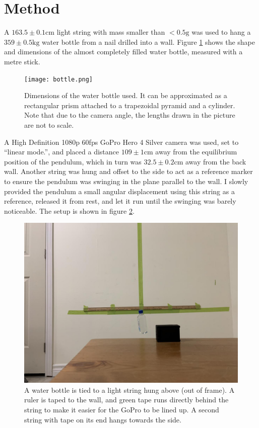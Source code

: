 \documentclass[%
 reprint,
 amsmath,amssymb
 aps,
]{revtex4-2}
\begin{document}
\section{Method}
A $163.5\pm 0.1 \si{\centi\metre}$ light string with mass smaller than $ <0.5\si{\gram}$ was used to hang a $359\pm 0.5\si{\kilogram}$ water bottle from a nail drilled into a wall.  Figure \ref{fig:bottle} shows the shape and dimensions of the almost completely filled water bottle, measured with a metre stick.
\begin{figure}[!h]
    \texttt{[image: bottle.png]}
    \caption{Dimensions of the water bottle used. It can be approximated as a rectangular prism attached to a trapezoidal pyramid and a cylinder. Note that due to the camera angle, the lengths drawn in the picture are not to scale.}
    \label{fig:bottle}
\end{figure}
A High Definition 1080p 60fps GoPro Hero 4 Silver camera was used, set to ``linear mode.'', and placed a distance $109 \pm \si{1\centi\metre}$ away from the equilibrium position of the pendulum, which in turn was $32.5\pm 0.2\si{\centi\metre}$ away from the back wall. Another string was hung and offset to the side to act as a reference marker to ensure the pendulum was swinging in the plane parallel to the wall. I slowly provided the pendulum a small angular displacement using this string as a reference, released it from rest, and let it run until the swinging was barely noticeable. The setup is shown in figure \ref{fig:setup}.
\begin{figure}[!h]
    \includegraphics[width=\linewidth]{setup.jpg}
    \caption{A water bottle is tied to a light string hung above (out of frame). A ruler is taped to the wall, and green tape runs directly behind the string to make it easier for the GoPro to be lined up. A second string with tape on its end hangs towards the side.}
    \label{fig:setup}
\end{figure}
\end{document}
